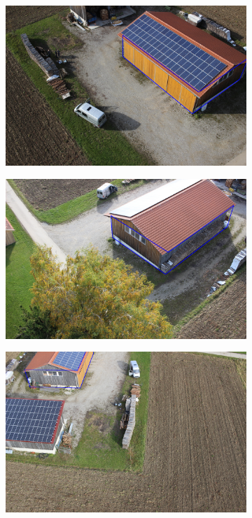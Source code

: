 \begin{figure}[H]
       \begin{subfigure}[tbp]{0.31\columnwidth}
           \centering
           \includegraphics[width=\textwidth]{optimize/IMG_0735_xyzh.png}
           \caption[]{}%
           {{\small }}
           \label{fig:5d}
       \end{subfigure}
       \begin{subfigure}[tbp]{0.31\columnwidth}  
           \centering 
           \includegraphics[width=\textwidth]{optimize/IMG_0765_xyzh.png}
           \caption[]{}%
           {{\small }}    
           \label{fig:5e}
       \end{subfigure}
       \begin{subfigure}[tbp]{0.31\columnwidth}  
           \centering 
           \includegraphics[width=\textwidth]{optimize/IMG_0951_xyzh.png}

\end{subfigure}
\end{figure}
